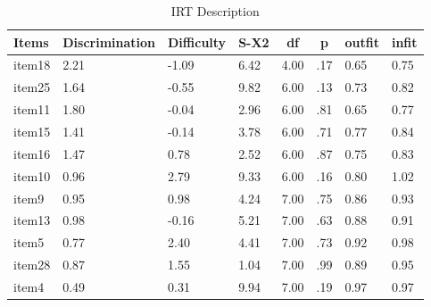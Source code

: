 \documentclass[
  man]{apa6}
\begin{document}
\begin{table}[tbp]

\begin{center}
\begin{threeparttable}

\caption{\label{tab:tabIRT}IRT Description}

\begin{tabular}{llllllll}
\toprule
Items & \multicolumn{1}{c}{Discrimination} & \multicolumn{1}{c}{Difficulty} & \multicolumn{1}{c}{S-X2} & \multicolumn{1}{c}{df} & \multicolumn{1}{c}{p} & \multicolumn{1}{c}{outfit} & \multicolumn{1}{c}{infit}\\
\midrule
item18 & 2.21 & -1.09 & 6.42 & 4.00 & .17 & 0.65 & 0.75\\
item25 & 1.64 & -0.55 & 9.82 & 6.00 & .13 & 0.73 & 0.82\\
item11 & 1.80 & -0.04 & 2.96 & 6.00 & .81 & 0.65 & 0.77\\
item15 & 1.41 & -0.14 & 3.78 & 6.00 & .71 & 0.77 & 0.84\\
item16 & 1.47 & 0.78 & 2.52 & 6.00 & .87 & 0.75 & 0.83\\
item10 & 0.96 & 2.79 & 9.33 & 6.00 & .16 & 0.80 & 1.02\\
item9 & 0.95 & 0.98 & 4.24 & 7.00 & .75 & 0.86 & 0.93\\
item13 & 0.98 & -0.16 & 5.21 & 7.00 & .63 & 0.88 & 0.91\\
item5 & 0.77 & 2.40 & 4.41 & 7.00 & .73 & 0.92 & 0.98\\
item28 & 0.87 & 1.55 & 1.04 & 7.00 & .99 & 0.89 & 0.95\\
item4 & 0.49 & 0.31 & 9.94 & 7.00 & .19 & 0.97 & 0.97\\
\bottomrule
\end{tabular}

\end{threeparttable}
\end{center}

\end{table}
\end{document}
